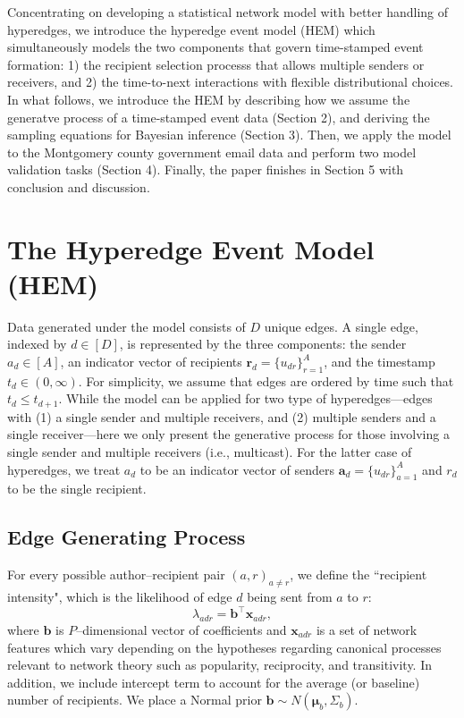 \documentclass[12pt]{article}
\begin{document}
Concentrating on developing a statistical network model with better handling of hyperedges, we introduce the hyperedge event model (HEM) which simultaneously models the two components that govern time-stamped event formation: 1) the recipient selection processs that allows multiple senders or receivers, and 2) the time-to-next interactions with flexible distributional choices. In what follows, we introduce the HEM by describing how we assume the generatve process of a time-stamped event data (Section 2), and deriving the sampling equations for Bayesian inference (Section 3). Then, we apply the model to the Montgomery county government email data and perform two model validation tasks (Section 4). Finally, the paper finishes in Section 5 with conclusion and discussion.

\section{The Hyperedge Event Model (HEM)}\label{sec:generative process}
Data generated under the model consists of $D$ unique edges. A single edge, indexed by $d \in [D]$, is represented by the three components: the sender $a_d \in [A]$, an indicator vector of recipients $\boldsymbol{r}_d = \{u_{dr} \}_{r=1}^{A}$, and the timestamp $t_d \in (0, \infty)$. For simplicity, we assume that edges are ordered by time such that $t_d \leq t_{d+1}$. While the model can be applied for two type of hyperedges---edges with (1) a single sender and multiple receivers, and (2) multiple senders and a single receiver---here we only present the generative process for those involving a single sender and multiple receivers (i.e., multicast). For the latter case of hyperedges, we treat $a_d$ to be an indicator vector of senders $\boldsymbol{a}_d = \{u_{dr} \}_{a=1}^{A}$ and $r_d$ to be the single recipient.
\subsection{Edge Generating Process}\label{subsec: Tie}
For every possible author--recipient pair $(a,r)_{a \neq r}$, we define the ``recipient intensity", which is the likelihood of edge $d$ being sent from $a$ to $r$:
\begin{equation}
\lambda_{adr} = {\boldsymbol{b}}^{\top}\boldsymbol{x}_{adr},
\end{equation}
where $\boldsymbol{b}$ is $P$--dimensional vector of coefficients and $\boldsymbol{x}_{adr}$ is a set of network features which vary depending on the hypotheses regarding canonical processes relevant to network theory such as popularity, reciprocity, and transitivity. In addition, we include intercept term to account for the average (or baseline) number of recipients. We place a Normal prior $\boldsymbol{b} \sim N(\boldsymbol{\mu}_b, \Sigma_b)$.
\end{document}
